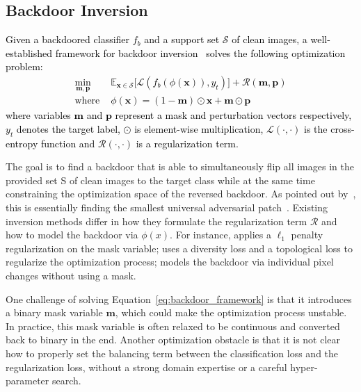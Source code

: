 \documentclass[10pt,twocolumn,letterpaper]{article}
\newcommand{\ms}[1]{\textcolor{black}{#1}}
\begin{document}
 

\subsection{Backdoor Inversion}\label{related:backdoor_inversion}
\ms{Given a backdoored classifier $f_{b}$ and a support set $\mathcal{S}$ of clean images, a well-established framework for backdoor inversion~\cite{nc2019wang} solves the following optimization problem:
\begin{align}\label{eq:backdoor_framework}
    \min_{\mathbf{m},\mathbf{p}} &\,\, \mathbb{E}_{\mathbf{x}\in \mathcal{S}} \big[\mathcal{L}(f_{b}(\phi(\mathbf{x})), y_{t})]+\mathcal{R}(\mathbf{m},\mathbf{p}) \\
    \text{where} &\,\, \phi(\mathbf{x})= (1-\mathbf{m})\odot \mathbf{x} + \mathbf{m}\odot \mathbf{p} \nonumber
\end{align}
where variables $\mathbf{m}$ and $\mathbf{p}$ represent a mask and perturbation vectors respectively, $y_{t}$ denotes the target label, $\odot$ is  element-wise multiplication, $\mathcal{L}(\cdot,\cdot)$ is the cross-entropy function and  $\mathcal{R}(\cdot,\cdot)$ is a regularization term.}

The goal is to find a backdoor that is able to simultaneously flip all images in the provided set S of clean images to the target class while at the same time constraining the optimization space of the reversed backdoor. As pointed out by~\cite{bagdasaryan2020blind}, this is essentially finding the smallest universal adversarial patch~\cite{adv_patch}. Existing inversion methods differ in how they formulate the regularization term $\mathcal{R}$ and how to model the backdoor via $\phi(x)$. For instance,  \cite{nc2019wang} applies a $\ell_{1}$ penalty regularization on the mask variable;  \cite{hu2022topo} uses a diversity loss and a topological loss to regularize the optimization process; \cite{pixelinv} models the backdoor via individual pixel changes without using a mask.


One challenge of solving  Equation~\ref{eq:backdoor_framework} is that it introduces a binary mask variable $\mathbf{m}$, which could make the optimization process unstable. In practice, this mask variable is often relaxed to be continuous and converted back to binary in the end. Another optimization obstacle is that it is not clear how to properly set the balancing term between the classification loss and the regularization loss,  without a strong domain expertise or a careful hyper-parameter search. 
\end{document}
